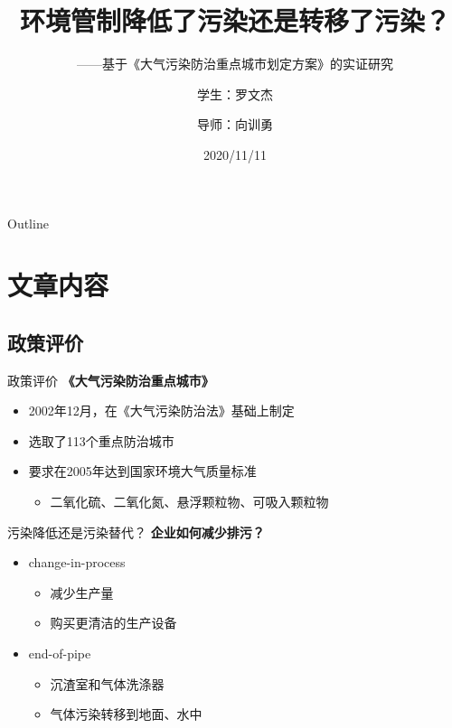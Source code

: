\documentclass[11pt,compress,xcolor=x11names,UTF8]{beamer}
\title{环境管制降低了污染还是转移了污染？}
\subtitle{——基于《大气污染防治重点城市划定方案》的实证研究}
\author[罗文杰]{学生：罗文杰 \and 导师：向训勇 }
\institute[暨南大学]{产业经济研究院 \and 2019级硕士开题答辩}
\date{2020/11/11}
\begin{document}
\maketitle

\begin{frame}{Outline}
\tableofcontents
\end{frame}

\section{文章内容}

\subsection{政策评价}

	\begin{frame}{政策评价}
		\textbf{《大气污染防治重点城市》}
		\begin{itemize}
			\item 2002年12月，在《大气污染防治法》基础上制定
			\item 选取了113个重点防治城市
			\item 要求在2005年达到国家环境大气质量标准
			\begin{itemize}
				\item 二氧化硫、二氧化氮、悬浮颗粒物、可吸入颗粒物
			\end{itemize}
		\end{itemize}
	\end{frame}

	\begin{frame}{污染降低还是污染替代？}
		\textbf{企业如何减少排污？}
	\begin{itemize}
		\item change-in-process
		\begin{itemize}
			\item 减少生产量
			\item 购买更清洁的生产设备
		\end{itemize}
	
		\item end-of-pipe
		\begin{itemize}
			\item 沉渣室和气体洗涤器
			\item 气体污染转移到地面、水中
		\end{itemize}
	\end{itemize}
	\end{frame}
\end{document}
